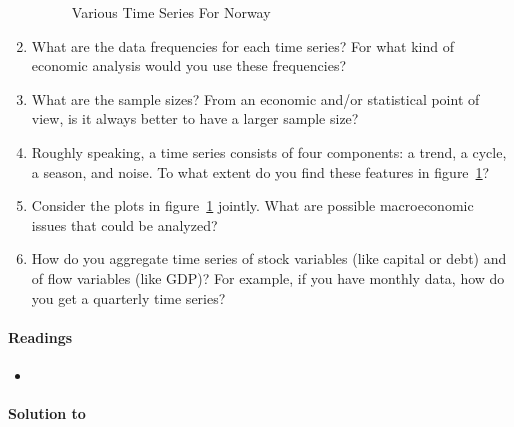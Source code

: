 \begin{enumerate}
\begin{figure}[htbp]
		\caption{Various Time Series For Norway}\label{fig:NorwayData}
		\end{figure}
   \item What are the data frequencies for each time series?
   For what kind of economic analysis would you use these frequencies?
   \item What are the sample sizes?
   From an economic and/or statistical point of view, is it always better to have a larger sample size?
   \item Roughly speaking, a time series consists of four components: a trend, a cycle, a season, and noise.
   To what extent do you find these features in figure~\ref{fig:NorwayData}?
   \item Consider the plots in figure~\ref{fig:NorwayData} jointly.
   What are possible macroeconomic issues that could be analyzed?
   \item How do you aggregate time series of stock variables (like capital or debt) and of flow variables (like GDP)?
   For example, if you have monthly data, how do you get a quarterly time series?
\end{enumerate}

\paragraph{Readings}
\begin{itemize}
   \item \textcite[Ch.1, Ch.2]{Bjornland.Thorsrud_2015_AppliedTimeSeries}
\end{itemize}

\begin{solution}\textbf{Solution to }
\ifDisplaySolutions%

\fi
\newpage
\end{solution}